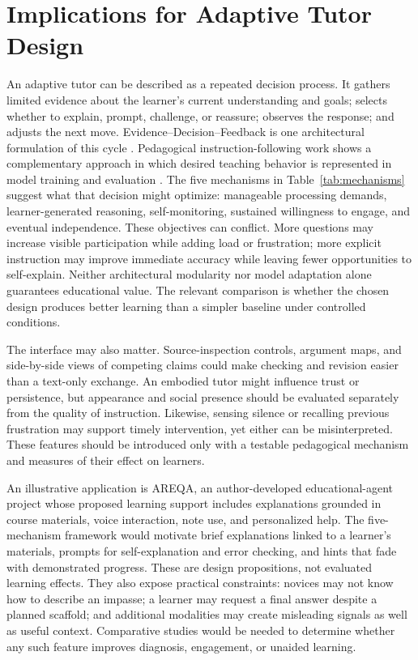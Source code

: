 \documentclass[11pt,a4paper]{article}
\begin{document}
\section{Implications for Adaptive Tutor Design}
An adaptive tutor can be described as a repeated decision process. It gathers limited evidence about the learner's current understanding and goals; selects whether to explain, prompt, challenge, or reassure; observes the response; and adjusts the next move. Evidence--Decision--Feedback is one architectural formulation of this cycle \cite{P23}. Pedagogical instruction-following work shows a complementary approach in which desired teaching behavior is represented in model training and evaluation \cite{P35,P49}. The five mechanisms in Table~\ref{tab:mechanisms} suggest what that decision might optimize: manageable processing demands, learner-generated reasoning, self-monitoring, sustained willingness to engage, and eventual independence. These objectives can conflict. More questions may increase visible participation while adding load or frustration; more explicit instruction may improve immediate accuracy while leaving fewer opportunities to self-explain. Neither architectural modularity nor model adaptation alone guarantees educational value. The relevant comparison is whether the chosen design produces better learning than a simpler baseline under controlled conditions.

The interface may also matter. Source-inspection controls, argument maps, and side-by-side views of competing claims could make checking and revision easier than a text-only exchange. An embodied tutor might influence trust or persistence, but appearance and social presence should be evaluated separately from the quality of instruction. Likewise, sensing silence or recalling previous frustration may support timely intervention, yet either can be misinterpreted. These features should be introduced only with a testable pedagogical mechanism and measures of their effect on learners.

An illustrative application is AREQA, an author-developed educational-agent project whose proposed learning support includes explanations grounded in course materials, voice interaction, note use, and personalized help. The five-mechanism framework would motivate brief explanations linked to a learner's materials, prompts for self-explanation and error checking, and hints that fade with demonstrated progress. These are design propositions, not evaluated learning effects. They also expose practical constraints: novices may not know how to describe an impasse; a learner may request a final answer despite a planned scaffold; and additional modalities may create misleading signals as well as useful context. Comparative studies would be needed to determine whether any such feature improves diagnosis, engagement, or unaided learning.
\end{document}

